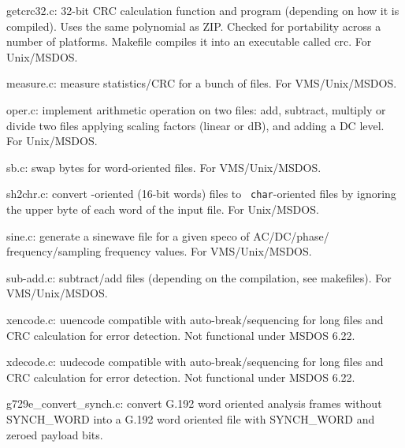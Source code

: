 \begin{Descr}{40mm}
\item[getcrc32.c:]
         32-bit CRC calculation function and program (depending on
         how it is compiled). Uses the same polynomial as
         ZIP. Checked for portability across a number of
         platforms. Makefile compiles it into an executable called
         crc. For Unix/MSDOS.

\item[measure.c:]
        measure statistics/CRC for a bunch of files.  For
        VMS/Unix/MSDOS.

\item[oper.c:]
            implement arithmetic operation on two files: add,
            subtract, multiply or divide two files applying
            scaling factors (linear or dB), and adding a DC
            level. For Unix/MSDOS.

\item[sb.c:]
        swap bytes for word-oriented files. For
        VMS/Unix/MSDOS.

\item[sh2chr.c:]
           convert \short-oriented (16-bit words) files to {\tt
           char}-oriented files by ignoring the upper byte of each
           word of the input file. For Unix/MSDOS.

\item[sine.c:]
        generate a sinewave file for a given speco of
        AC/DC/phase/ frequency/sampling frequency values. For
        VMS/Unix/MSDOS.

\item[sub-add.c:]
        subtract/add files (depending on the compilation, see
        makefiles). For VMS/Unix/MSDOS.


\item[xencode.c:]
        uuencode compatible with auto-break/sequencing for
        long files and CRC calculation for error
        detection. Not functional under MSDOS 6.22.

\item[xdecode.c:]
        uudecode compatible with auto-break/sequencing for
        long files and CRC calculation for error
        detection. Not functional under MSDOS 6.22.

\item[g729e\_convert\_synch.c:]
        convert G.192 word oriented analysis 
        frames without SYNCH\_WORD into a G.192 word oriented 
        file with SYNCH\_WORD and zeroed payload bits. 
         
\end{Descr}


